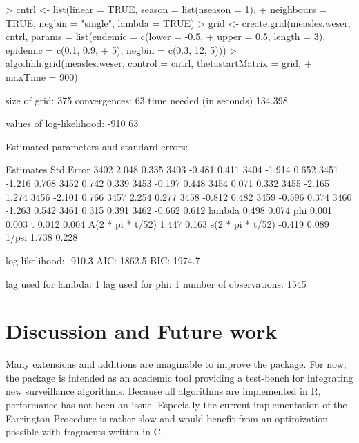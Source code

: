 \documentclass[a4paper,11pt]{article}
\begin{document}
\begin{Schunk}
\begin{Sinput}
> cntrl <- list(linear = TRUE, season = list(nseason = 1), 
+     neighbours = TRUE, negbin = "single", lambda = TRUE)
> grid <- create.grid(measles.weser, cntrl, params = list(endemic = c(lower = -0.5, 
+     upper = 0.5, length = 3), epidemic = c(0.1, 0.9, 
+     5), negbin = c(0.3, 12, 5)))
> algo.hhh.grid(measles.weser, control = cntrl, thetastartMatrix = grid, 
+     maxTime = 900)
\end{Sinput}
\end{Schunk}
\begin{Schunk}
\begin{Soutput}
size of grid:  375 
convergences:  63 
time needed (in seconds) 134.398 

values of log-likelihood:
-910 
  63 

Estimated parameters and standard errors: 

                  Estimates  Std.Error
3402                  2.048      0.335
3403                 -0.481      0.411
3404                 -1.914      0.652
3451                 -1.216      0.708
3452                  0.742      0.339
3453                 -0.197      0.448
3454                  0.071      0.332
3455                 -2.165      1.274
3456                 -2.101      0.766
3457                  2.254      0.277
3458                 -0.812      0.482
3459                 -0.596      0.374
3460                 -1.263      0.542
3461                  0.315      0.391
3462                 -0.662      0.612
lambda                0.498      0.074
phi                   0.001      0.003
t                     0.012      0.004
A(2 * pi * t/52)      1.447      0.163
s(2 * pi * t/52)     -0.419      0.089
1/psi                 1.738      0.228

log-likelihood:    -910.3 
AIC:               1862.5 
BIC:               1974.7 

lag used for lambda:       1 
lag used for phi:          1 
number of observations:    1545 
\end{Soutput}
\end{Schunk}



\section{Discussion and Future work}
Many extensions and additions are imaginable to improve the package.
For now, the package is intended as an academic tool providing a
test-bench for integrating new surveillance algorithms. Because all
algorithms are implemented in R, performance has not been an issue.
Especially the current implementation of the Farrington Procedure is
rather slow and would benefit from an optimization possible with
fragments written in C.
\end{document}
